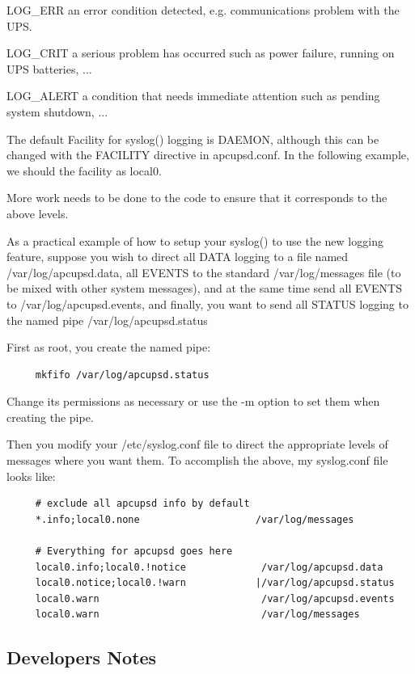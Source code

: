 {{{{{{{{{LOG\_ERR an error condition detected, e.g. communications problem with the
UPS.  

LOG\_CRIT a serious problem has occurred such as power failure, running on UPS
batteries, ...  

LOG\_ALERT a condition that needs immediate attention such as pending system
shutdown, ...  

The default Facility for syslog() logging is DAEMON, although this can be
changed with the FACILITY directive in apcupsd.conf. In the following example,
we should the facility as local0.  

More work needs to be done to the code to ensure that it corresponds to the
above levels.  

As a practical example of how to setup your syslog() to use the new logging
feature, suppose you wish to direct all DATA logging to a file named
/var/log/apcupsd.data, all EVENTS to the standard /var/log/messages file (to
be mixed with other system messages), and at the same time send all EVENTS to
/var/log/apcupsd.events, and finally, you want to send all STATUS logging to
the named pipe /var/log/apcupsd.status  

First as root, you create the named pipe: 

\footnotesize
\begin{verbatim}
     mkfifo /var/log/apcupsd.status
\end{verbatim}
\normalsize

Change its permissions as necessary or use the -m option to set them when
creating the pipe.  

Then you modify your /etc/syslog.conf file to direct the appropriate levels of
messages where you want them. To accomplish the above, my syslog.conf file
looks like: 

\footnotesize
\begin{verbatim}
     # exclude all apcupsd info by default
     *.info;local0.none                    /var/log/messages
     
     # Everything for apcupsd goes here
     local0.info;local0.!notice             /var/log/apcupsd.data
     local0.notice;local0.!warn            |/var/log/apcupsd.status
     local0.warn                            /var/log/apcupsd.events
     local0.warn                            /var/log/messages
\end{verbatim}
\normalsize

\label{Developers-Notes}

\subsection*{Developers Notes}

}}}}}}}}}
